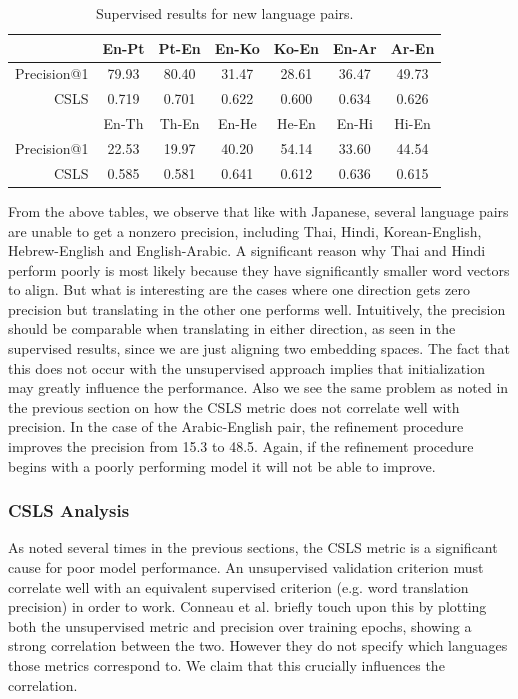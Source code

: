 \documentclass{article}
\begin{document}
\begin{table}[h]
  \centering
  \begin{tabular}{r|cc|cc|cc}
    \toprule
    & En-Pt & Pt-En & En-Ko & Ko-En & En-Ar & Ar-En \\
    \midrule
    Precision@1 & 79.93 & 80.40 & 31.47 & 28.61 & 36.47 & 49.73 \\
    CSLS        & 0.719 & 0.701 & 0.622 & 0.600 & 0.634 & 0.626 \\
    \midrule
    \midrule
    & En-Th & Th-En & En-He & He-En & En-Hi & Hi-En \\
    \midrule
    Precision@1 & 22.53 & 19.97 & 40.20 & 54.14 & 33.60 & 44.54 \\
    CSLS        & 0.585 & 0.581 & 0.641 & 0.612 & 0.636 & 0.615 \\
    \bottomrule
  \end{tabular}
  \caption{Supervised results for new language pairs.}
\end{table}

From the above tables, we observe that like with Japanese, several
language pairs are unable to get a nonzero precision, including Thai,
Hindi, Korean-English, Hebrew-English and English-Arabic.
A significant reason why Thai and Hindi perform poorly is most likely
because they have significantly smaller word vectors to align. But what
is interesting are the cases where one direction gets zero precision
but translating in the other one performs well. Intuitively, the
precision should be comparable when translating in either direction, as
seen in the supervised results, since we are just aligning two
embedding spaces. The fact that this does not occur with the
unsupervised approach implies that initialization may greatly influence
the performance. Also we see the same problem as noted in the previous
section on how the CSLS metric does not correlate well with precision.
In the case of the Arabic-English pair, the refinement procedure improves
the precision from 15.3 to 48.5. Again, if the refinement procedure
begins with a poorly performing model it will not be able to improve.

\subsubsection*{CSLS Analysis}

As noted several times in the previous sections, the CSLS metric is a
significant cause for poor model performance. An unsupervised validation
criterion must correlate well with an equivalent supervised criterion (e.g. word
translation precision) in order to work. Conneau et al. briefly touch upon this
by plotting both the unsupervised metric and precision over training epochs,
showing a strong correlation between the two. However they do not specify which
languages those metrics correspond to. We claim that this crucially influences
the correlation.
\end{document}
